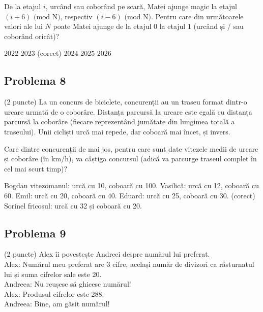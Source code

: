 \documentclass{exam}
\begin{document}
De la etajul $i$, urcând sau coborând pe scară, Matei ajunge magic la etajul $(i+6)\textrm{ (mod N)}$, respectiv $(i - 6)\textrm{ (mod N)}$.
Pentru care din următoarele valori ale lui $N$ poate Matei ajunge de la etajul $0$ la etajul $1$ (urcând și / sau coborând oricât)?  


\begin{oneparchoices}
 \choice $2022$
 \choice $2023$ (corect)
 \choice $2024$
 \choice $2025$
 \choice $2026$
\end{oneparchoices}


\subsection*{Problema 8}

(2 puncte) La un concurs de biciclete, concurenții au un traseu format dintr-o urcare urmată de o coborâre. Distanța parcursă la urcare este egală cu distanța parcursă la coborâre (fiecare reprezentând jumătate din lungimea totală a traseului). Unii cicliști urcă mai repede, dar coboară mai încet, și invers. 



Care dintre concurenții de mai jos, pentru care sunt date vitezele medii de urcare și coborâre (în km/h), va câștiga concursul (adică va parcurge traseul complet în cel mai scurt timp)?

\begin{oneparchoices}
    \choice Bogdan vitezomanul: urcă cu 10, coboară cu 100.
    \choice Vasilică: urcă cu 12, coboară cu 60.
    \choice Emil: urcă cu 20, coboară cu 40.
    \choice Eduard: urcă cu 25, coboară cu 30.  (corect)
    \choice Sorinel fricosul: urcă cu 32 și coboară cu 20.
\end{oneparchoices}



\subsection*{Problema 9}

(2 puncte) Alex îi povestește Andreei despre numărul lui preferat.\\
Alex: Numărul meu preferat are 3 cifre, același număr de divizori ca răsturnatul lui și suma cifrelor sale este 20. \\
Andreea: Nu reușesc să ghicesc numărul! \\
Alex: Produsul cifrelor este 288. \\
Andreea: Bine, am găsit numărul! \\
\end{document}
